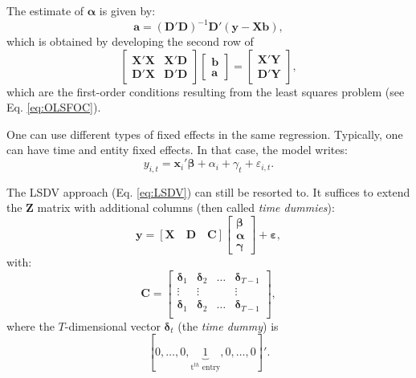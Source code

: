 \documentclass[
  12pt,
]{book}
\theoremstyle{definition}
\theoremstyle{definition}
\theoremstyle{definition}
\theoremstyle{definition}
\theoremstyle{remark}
\begin{document}
The estimate of \(\boldsymbol\alpha\) is given by:
\begin{equation}
\boxed{\mathbf{a} = (\mathbf{D}'\mathbf{D})^{-1}\mathbf{D}'(\mathbf{y} - \mathbf{X}\mathbf{b}),} \label{eq:a}
\end{equation}
which is obtained by developing the second row of
\[
\left[
\begin{array}{cc}
\mathbf{X}'\mathbf{X} & \mathbf{X}'\mathbf{D}\\
\mathbf{D}'\mathbf{X} & \mathbf{D}'\mathbf{D}
\end{array}\right]
\left[
\begin{array}{c}
\mathbf{b}\\
\mathbf{a}
\end{array}\right] =
\left[
\begin{array}{c}
\mathbf{X}'\mathbf{Y}\\
\mathbf{D}'\mathbf{Y}
\end{array}\right],
\]
which are the first-order conditions resulting from the least squares problem (see Eq. \eqref{eq:OLSFOC}).

One can use different types of fixed effects in the same regression. Typically, one can have time and entity fixed effects. In that case, the model writes:
\[
y_{i,t} = \mathbf{x}_i'\boldsymbol\beta + \alpha_i + \gamma_t + \varepsilon_{i,t}.
\]

The LSDV approach (Eq. \eqref{eq:LSDV}) can still be resorted to. It suffices to extend the \(\mathbf{Z}\) matrix with additional columns (then called \emph{time dummies}):
\begin{equation}
\mathbf{y} = [\mathbf{X} \quad \mathbf{D} \quad \mathbf{C}]
\left[
\begin{array}{c}
\boldsymbol\beta\\
\boldsymbol\alpha\\
\boldsymbol\gamma
\end{array}
\right]
+ \boldsymbol\varepsilon, \label{eq:LSDV2}
\end{equation}
with:
\[
\mathbf{C} = \left[\begin{array}{cccc}
\boldsymbol{\delta}_1&\boldsymbol{\delta}_2&\dots&\boldsymbol{\delta}_{T-1}\\
\vdots&\vdots&&\vdots\\
\boldsymbol{\delta}_1&\boldsymbol{\delta}_2&\dots&\boldsymbol{\delta}_{T-1}\\
\end{array}\right],
\]
where the \(T\)-dimensional vector \(\boldsymbol\delta_t\) (the \emph{time dummy}) is
\[
[0,\dots,0,\underbrace{1}_{\mbox{t$^{th}$ entry}},0,\dots,0]'.
\]
\end{document}
